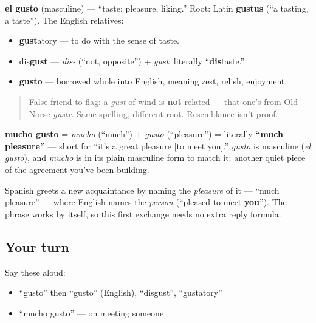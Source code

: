 \begin{cousinweb}
\textbf{el gusto} (masculine) — \textquotedblleft{}taste; pleasure, liking.\textquotedblright{} Root: Latin \textbf{gustus} (\textquotedblleft{}a tasting, a taste\textquotedblright{}). The English relatives:

\begin{itemize}
\raggedright
  \item \textbf{gust}atory — to do with the sense of taste.
  \item dis\textbf{gust} — \emph{dis-} (\textquotedblleft{}not, opposite\textquotedblright{}) + \emph{gust}: literally \textquotedblleft{}\textbf{dis}taste.\textquotedblright{}
  \item \textbf{gusto} — borrowed whole into English, meaning zest, relish, enjoyment.
\end{itemize}

\begin{quote}
False friend to flag: a \emph{gust} of wind is \textbf{not} related — that one's from Old Norse \emph{gustr}. Same spelling, different root. Resemblance isn't proof.
\end{quote}

\textbf{mucho gusto} = \emph{mucho} (\textquotedblleft{}much\textquotedblright{}) + \emph{gusto} (\textquotedblleft{}pleasure\textquotedblright{}) = literally \textbf{\textquotedblleft{}much pleasure\textquotedblright{}} — short for \textquotedblleft{}it's a great pleasure {[}to meet you{]}.\textquotedblright{} \emph{gusto} is masculine (\emph{el gusto}), and \emph{mucho} is in its plain masculine form to match it: another quiet piece of the agreement you've been building.
\end{cousinweb}

\begin{culture}
Spanish greets a new acquaintance by naming the \emph{pleasure} of it — \textquotedblleft{}much pleasure\textquotedblright{} — where English names the \emph{person} (\textquotedblleft{}pleased to meet \textbf{you}\textquotedblright{}). The phrase works by itself, so this first exchange needs no extra reply formula.
\end{culture}

\subsection*{Your turn}
Say these aloud:

\begin{itemize}
\raggedright
  \item \textquotedblleft{}gusto\textquotedblright{} then \textquotedblleft{}gusto\textquotedblright{} (English), \textquotedblleft{}disgust\textquotedblright{}, \textquotedblleft{}gustatory\textquotedblright{}
  \item \textquotedblleft{}mucho gusto\textquotedblright{} — on meeting someone
\end{itemize}

